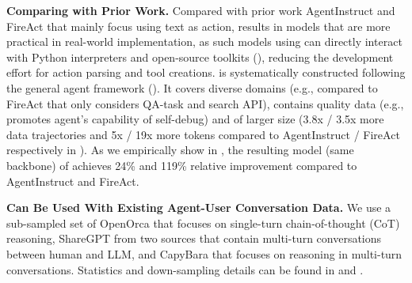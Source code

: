 \noindent \textbf{Comparing \dataname with Prior Work.}
Compared with prior work AgentInstruct \citep{zeng2023agenttuning} and FireAct \citep{chen2023fireact} that mainly focus using text as action, \dataname results in models that are more practical in real-world implementation, as such models using \approach can directly interact with Python interpreters and open-source toolkits (), reducing the development effort for action parsing and tool creations.
% 
\dataname is systematically constructed following the general agent framework ().
% 
It covers diverse domains (e.g., compared to FireAct that only considers QA-task and search API), contains quality data (e.g., promotes agent's capability of self-debug) and of larger size (3.8x / 3.5x more data trajectories and 5x / 19x more tokens compared to AgentInstruct / FireAct respectively in ). 
% 
As we empirically show in , the resulting model (same backbone) of \dataname achieves 24\% and 119\% relative improvement compared to AgentInstruct and FireAct.


\noindent \textbf{\dataname Can Be Used With Existing Agent-User Conversation Data.}
\label{sec:agent_user_data}
We use a sub-sampled set of OpenOrca \citep{OpenOrca} that focuses on single-turn chain-of-thought (CoT) reasoning, ShareGPT \citep{sharegpt_dataset, sharegpt4_dataset} from two sources that contain multi-turn conversations between human and LLM, and CapyBara \citep{capybara_dataset} that focuses on reasoning in multi-turn conversations.
%
Statistics and down-sampling details can be found in  and .
% 


